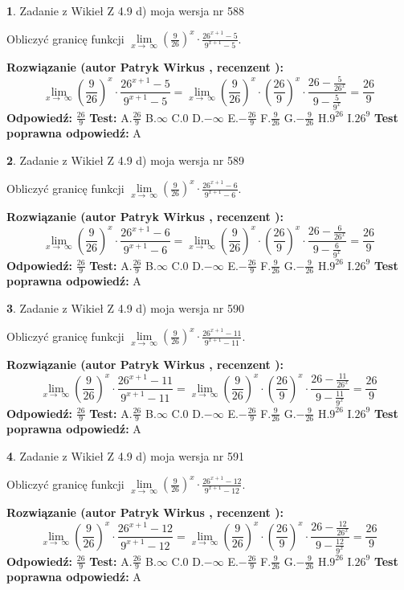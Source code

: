 \documentclass[12pt, a4paper]{article}
\theoremstyle{definition} %
\newtheorem{zad}{}
\newcommand{\zadStart}[1]{\begin{zad}#1\newline}
\newcommand{\zadStop}{\end{zad}}
\newcommand{\rozwStart}[2]{\noindent \textbf{Rozwiązanie (autor #1 , recenzent #2): }\newline}
\newcommand{\rozwStop}{\newline}
\newcommand{\odpStart}{\noindent \textbf{Odpowiedź:}\newline}
\newcommand{\odpStop}{\newline}
\newcommand{\testStart}{\noindent \textbf{Test:}\newline}
\newcommand{\testStop}{\newline}
\newcommand{\kluczStart}{\noindent \textbf{Test poprawna odpowiedź:}\newline}
\newcommand{\kluczStop}{\newline}
\begin{document}
\zadStart{Zadanie z Wikieł Z 4.9 d) moja wersja nr 588}


Obliczyć granicę funkcji  $\lim\limits_{x\to\ \infty}(\frac{9}{26})^{x}\cdot\frac{26^{x+1}-5}{9^{x+1}-5}$.
\zadStop
\rozwStart{Patryk Wirkus}{}
$$\lim\limits_{x\to\ \infty}(\frac{9}{26})^{x}\cdot\frac{26^{x+1}-5}{9^{x+1}-5}=\lim\limits_{x\to\ \infty}(\frac{9}{26})^{x}\cdot(\frac{26}{9})^{x} \cdot \frac{26-\frac{5}{26^{x}}}{9-\frac{5}{9^{x}}} = \frac{26}{9}$$
\rozwStop
\odpStart
$\frac{26}{9}$
\odpStop
\testStart
A.$\frac{26}{9}$ B.$\infty$ C.$0$ D.$-\infty$ E.$-\frac{26}{9}$
F.$\frac{9}{26}$ G.$-\frac{9}{26}$
H.$9^{26}$
I.$26^{9}$
\testStop
\kluczStart
A
\kluczStop



\zadStart{Zadanie z Wikieł Z 4.9 d) moja wersja nr 589}


Obliczyć granicę funkcji  $\lim\limits_{x\to\ \infty}(\frac{9}{26})^{x}\cdot\frac{26^{x+1}-6}{9^{x+1}-6}$.
\zadStop
\rozwStart{Patryk Wirkus}{}
$$\lim\limits_{x\to\ \infty}(\frac{9}{26})^{x}\cdot\frac{26^{x+1}-6}{9^{x+1}-6}=\lim\limits_{x\to\ \infty}(\frac{9}{26})^{x}\cdot(\frac{26}{9})^{x} \cdot \frac{26-\frac{6}{26^{x}}}{9-\frac{6}{9^{x}}} = \frac{26}{9}$$
\rozwStop
\odpStart
$\frac{26}{9}$
\odpStop
\testStart
A.$\frac{26}{9}$ B.$\infty$ C.$0$ D.$-\infty$ E.$-\frac{26}{9}$
F.$\frac{9}{26}$ G.$-\frac{9}{26}$
H.$9^{26}$
I.$26^{9}$
\testStop
\kluczStart
A
\kluczStop



\zadStart{Zadanie z Wikieł Z 4.9 d) moja wersja nr 590}


Obliczyć granicę funkcji  $\lim\limits_{x\to\ \infty}(\frac{9}{26})^{x}\cdot\frac{26^{x+1}-11}{9^{x+1}-11}$.
\zadStop
\rozwStart{Patryk Wirkus}{}
$$\lim\limits_{x\to\ \infty}(\frac{9}{26})^{x}\cdot\frac{26^{x+1}-11}{9^{x+1}-11}=\lim\limits_{x\to\ \infty}(\frac{9}{26})^{x}\cdot(\frac{26}{9})^{x} \cdot \frac{26-\frac{11}{26^{x}}}{9-\frac{11}{9^{x}}} = \frac{26}{9}$$
\rozwStop
\odpStart
$\frac{26}{9}$
\odpStop
\testStart
A.$\frac{26}{9}$ B.$\infty$ C.$0$ D.$-\infty$ E.$-\frac{26}{9}$
F.$\frac{9}{26}$ G.$-\frac{9}{26}$
H.$9^{26}$
I.$26^{9}$
\testStop
\kluczStart
A
\kluczStop



\zadStart{Zadanie z Wikieł Z 4.9 d) moja wersja nr 591}


Obliczyć granicę funkcji  $\lim\limits_{x\to\ \infty}(\frac{9}{26})^{x}\cdot\frac{26^{x+1}-12}{9^{x+1}-12}$.
\zadStop
\rozwStart{Patryk Wirkus}{}
$$\lim\limits_{x\to\ \infty}(\frac{9}{26})^{x}\cdot\frac{26^{x+1}-12}{9^{x+1}-12}=\lim\limits_{x\to\ \infty}(\frac{9}{26})^{x}\cdot(\frac{26}{9})^{x} \cdot \frac{26-\frac{12}{26^{x}}}{9-\frac{12}{9^{x}}} = \frac{26}{9}$$
\rozwStop
\odpStart
$\frac{26}{9}$
\odpStop
\testStart
A.$\frac{26}{9}$ B.$\infty$ C.$0$ D.$-\infty$ E.$-\frac{26}{9}$
F.$\frac{9}{26}$ G.$-\frac{9}{26}$
H.$9^{26}$
I.$26^{9}$
\testStop
\kluczStart
A
\kluczStop
\end{document}

